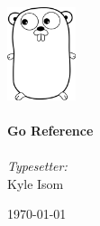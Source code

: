 \begin{titlepage}

\begin{center}


\includegraphics[width=0.15\textwidth]{./frontpage}\\[1cm]    


\HRule \\[0.4cm]
{ \huge \bfseries Go Reference}\\[0.4cm]

\HRule \\[1.5cm]

\emph{Typesetter:}\\Kyle Isom
\vfill

{\large \today}

\end{center}

\end{titlepage}
